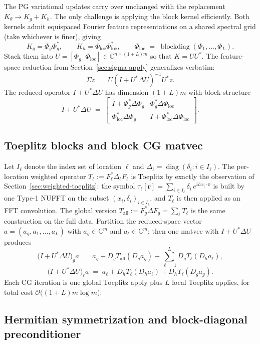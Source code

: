 \documentclass{article}
\newcommand{\C}{\mathbb{C}}
\newcommand{\calO}{\mathcal{O}}
\DeclareMathOperator{\diag}{diag}
\begin{document}
The PG variational updates carry over unchanged with the replacement $K_\theta\to K_g+K_h$. The only challenge is applying the block kernel efficiently. Both kernels admit equispaced Fourier feature representations on a shared spectral grid (take whichever is finer), giving
\[
  K_g = \Phi_g\Phi_g^{*},
  \qquad
  K_h = \Phi_{\text{loc}}\Phi_{\text{loc}}^{*},
  \qquad
  \Phi_{\text{loc}} \;=\; \operatorname{blockdiag}(\Phi_1,\ldots,\Phi_L).
\]
Stack them into $U=[\Phi_g\;\;\Phi_{\text{loc}}]\in\C^{n\times(1+L)m}$ so that $K=UU^{*}$. The feature-space reduction from Section~\ref{sec:sigma-apply} generalizes verbatim:
\[
  \boxed{\;\Sigma z \;=\; U(I+U^{*}\Delta U)^{-1}U^{*}z.\;}
\]
The reduced operator $I+U^{*}\Delta U$ has dimension $(1+L)m$ with block structure
\[
  I + U^{*}\Delta U
  \;=\;
  \begin{bmatrix}
    I + \Phi_g^{*}\Delta\Phi_g & \Phi_g^{*}\Delta\Phi_{\text{loc}}\\[2pt]
    \Phi_{\text{loc}}^{*}\Delta\Phi_g & I + \Phi_{\text{loc}}^{*}\Delta\Phi_{\text{loc}}
  \end{bmatrix}.
\]

\subsection{Toeplitz blocks and block CG matvec}

Let $I_\ell$ denote the index set of location $\ell$ and $\Delta_\ell=\diag(\delta_i:i\in I_\ell)$. The per-location weighted operator $T_\ell:=F_\ell^{*}\Delta_\ell F_\ell$ is Toeplitz by exactly the observation of Section~\ref{sec:weighted-toeplitz}: the symbol $\tau_\ell[\bm{r}]=\sum_{i\in I_\ell}\delta_i\,e^{i h x_i\cdot\bm{r}}$ is built by one Type-1 NUFFT on the subset $(x_i,\delta_i)_{i\in I_\ell}$, and $T_\ell$ is then applied as an FFT convolution. The global version $T_{\text{all}}:=F_g^{*}\Delta F_g=\sum_\ell T_\ell$ is the same construction on the full data. Partition the reduced-space vector $a=(a_g,a_1,\ldots,a_L)$ with $a_g\in\C^{m}$ and $a_\ell\in\C^{m}$; then one matvec with $I+U^{*}\Delta U$ produces
\[
  \bigl(I+U^{*}\Delta U\bigr)_g a
  \;=\;
  a_g + D_g T_{\text{all}}(D_g a_g) + \sum_{\ell=1}^{L}D_g T_\ell(D_h a_\ell),
\]
\[
  \bigl(I+U^{*}\Delta U\bigr)_\ell a
  \;=\;
  a_\ell + D_h T_\ell(D_h a_\ell) + D_h T_\ell(D_g a_g).
\]
Each CG iteration is one global Toeplitz apply plus $L$ local Toeplitz applies, for total cost $\calO\!\bigl((1+L)m\log m\bigr)$.

\subsection{Hermitian symmetrization and block-diagonal preconditioner}
\end{document}
